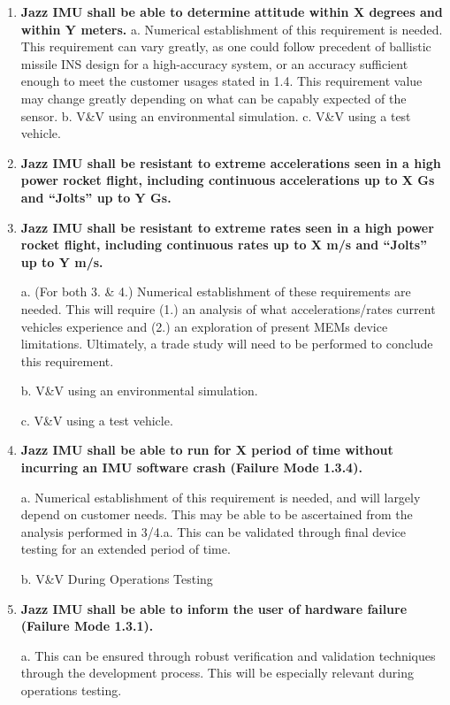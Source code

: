 \documentclass[14pt,a4paper]{article}
\begin{document}
\begin{CenturySchool}
\begin{enumerate}
					\item{\bfseries Jazz IMU shall be able to determine attitude within X degrees and within Y meters.}
					\subitem a.	Numerical establishment of this requirement is needed. This requirement can vary greatly, as one could follow precedent of ballistic missile INS design for a high-accuracy system, or an accuracy sufficient enough to meet the customer usages stated in 1.4. This requirement value may change greatly depending on what can be capably expected of the sensor.
					\subitem b.	V\&V using an environmental simulation.
					\subitem c.	V\&V using a test vehicle.
					
					
					\item{\bfseries Jazz IMU shall be resistant to extreme accelerations seen in a high power rocket flight, including continuous accelerations up to X Gs and “Jolts” up to Y Gs.}
					
					\item{\bfseries Jazz IMU shall be resistant to extreme rates seen in a high power rocket flight, including continuous rates up to X m/s and “Jolts” up to Y m/s.}
					
					\subitem a.	(For both 3. \& 4.) Numerical establishment of these requirements are needed. This will require (1.) an analysis of what accelerations/rates current vehicles experience and (2.) an exploration of present MEMs device limitations. Ultimately, a trade study will need to be performed to conclude this requirement.
					
					\subitem b.	V\&V using an environmental simulation.
					
					\subitem c.	V\&V using a test vehicle.
					
					
					\item{\bfseries Jazz IMU shall be able to run for X period of time without incurring an IMU software crash (Failure Mode 1.3.4).}
					
					\subitem a.	Numerical establishment of this requirement is needed, and will largely depend on customer needs. This may be able to be ascertained from the analysis performed in 3/4.a. This can be validated through final device testing for an extended period of time.
					
					\subitem b. V\&V During Operations Testing
					
					\item{\bfseries Jazz IMU shall be able to inform the user of hardware failure (Failure Mode 1.3.1).}
					
					\subitem a.	This can be ensured through robust verification and validation techniques through the development process. This will be especially relevant during operations testing.
					

\end{enumerate}
\end{CenturySchool}
\end{document}
